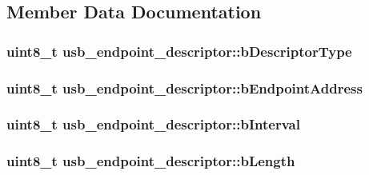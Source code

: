 \subsection{Member Data Documentation}
\hypertarget{structusb__endpoint__descriptor_aa6e24b3aa0c8130a4d39f2133ac5ed12}{
\subsubsection[{b\-Descriptor\-Type}]{\setlength{\rightskip}{0pt plus 5cm}uint8\-\_\-t usb\-\_\-endpoint\-\_\-descriptor\-::b\-Descriptor\-Type}}\label{structusb__endpoint__descriptor_aa6e24b3aa0c8130a4d39f2133ac5ed12}
\hypertarget{structusb__endpoint__descriptor_a5007051761d339b5bb27268a016947a5}{
\subsubsection[{b\-Endpoint\-Address}]{\setlength{\rightskip}{0pt plus 5cm}uint8\-\_\-t usb\-\_\-endpoint\-\_\-descriptor\-::b\-Endpoint\-Address}}\label{structusb__endpoint__descriptor_a5007051761d339b5bb27268a016947a5}
\hypertarget{structusb__endpoint__descriptor_a8fbc4ec9a4230f70729db036cfc07c44}{
\subsubsection[{b\-Interval}]{\setlength{\rightskip}{0pt plus 5cm}uint8\-\_\-t usb\-\_\-endpoint\-\_\-descriptor\-::b\-Interval}}\label{structusb__endpoint__descriptor_a8fbc4ec9a4230f70729db036cfc07c44}
\hypertarget{structusb__endpoint__descriptor_aac9ff1940e27153339becfd460c5b796}{
\subsubsection[{b\-Length}]{\setlength{\rightskip}{0pt plus 5cm}uint8\-\_\-t usb\-\_\-endpoint\-\_\-descriptor\-::b\-Length}}\label{structusb__endpoint__descriptor_aac9ff1940e27153339becfd460c5b796}

